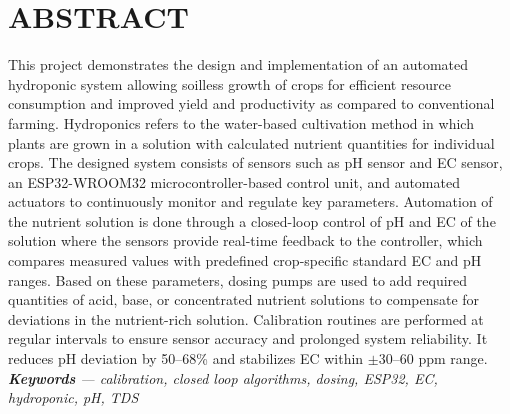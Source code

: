 \chapter*{ABSTRACT}

This project demonstrates the design and implementation of an automated hydroponic system allowing soilless growth of crops for efficient resource consumption and improved yield and productivity as compared to conventional farming. Hydroponics refers to the water-based cultivation method in which plants are grown in a solution with calculated nutrient quantities for individual crops. The designed system consists of sensors such as pH sensor and EC sensor, an ESP32-WROOM32 microcontroller-based control unit, and automated actuators to continuously monitor and regulate key parameters. Automation of the nutrient solution is done through a closed-loop control of pH and EC of the solution where the sensors provide real-time feedback to the controller, which compares measured values with predefined crop-specific standard EC and pH ranges. Based on these parameters, dosing pumps are used to add required quantities of acid, base, or concentrated nutrient solutions to compensate for deviations in the nutrient-rich solution. Calibration routines are performed at regular intervals to ensure sensor accuracy and prolonged system reliability. It reduces pH deviation by 50--68\% and stabilizes EC within $\pm$30--60 ppm range.\\[10pt]
\textit{\textbf{Keywords} --- calibration, closed loop algorithms, dosing, ESP32, EC, hydroponic, pH, TDS}